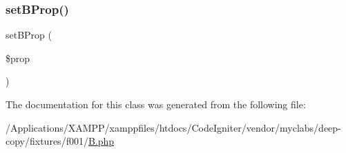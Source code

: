 \subsubsection{\texorpdfstring{set\+B\+Prop()}{setBProp()}}
{\footnotesize\ttfamily set\+B\+Prop (\begin{DoxyParamCaption}\item[{}]{\$prop }\end{DoxyParamCaption})}



The documentation for this class was generated from the following file\+:\begin{DoxyCompactItemize}
\item 
/\+Applications/\+X\+A\+M\+P\+P/xamppfiles/htdocs/\+Code\+Igniter/vendor/myclabs/deep-\/copy/fixtures/f001/\mbox{\hyperlink{f001_2_b_8php}{B.\+php}}\end{DoxyCompactItemize}
